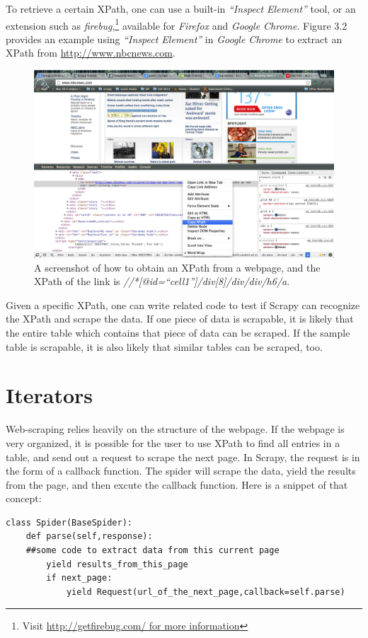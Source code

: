 \documentclass[12pt,twoside,draft]{report}
\begin{document}
To retrieve a certain XPath, one can use a built-in \textit{``Inspect Element''} tool, or an extension such as \textit{firebug},\footnote{Visit \url{http://getfirebug.com/ for more information}} available for \textit{Firefox} and \textit{Google Chrome}. Figure 3.2 provides an example using \textit{``Inspect Element''} in \textit{Google Chrome} to extract an XPath from \url{http://www.nbcnews.com}.\\
\begin{figure}[htp]
\includegraphics[width=\textwidth]{XPath_example.png}
\caption[How to extract XPath]
{A screenshot of how to obtain an XPath from a webpage, and the XPath of the link is \textit{//*[@id=``cell1'']/div[8]/div/div/h6/a}.}
\end{figure}
Given a specific XPath, one can write related code to test if Scrapy can recognize the XPath and scrape the data. If one piece of data is scrapable, it is likely that the entire table which contains that piece of data can be scraped. If the sample table is scrapable, it is also likely that similar tables can be scraped, too.
\newpage
\section{Iterators}

Web-scraping relies heavily on the structure of the webpage. If the webpage is very organized, it is possible for the user to use XPath to find all entries in a table, and send out a request to scrape the next page. In Scrapy, the request is in the form of a callback function. The spider will scrape the data, yield the results from the page, and then excute the callback function. Here is a snippet of that concept:
\begin{lstlisting}
class Spider(BaseSpider):
	def parse(self,response):
	##some code to extract data from this current page
		yield results_from_this_page
		if next_page:
			yield Request(url_of_the_next_page,callback=self.parse)
\end{lstlisting}
\end{document}

